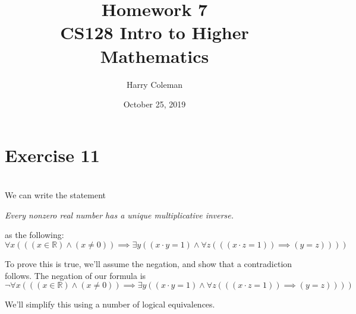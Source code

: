 \documentclass[11pt]{article}
\newcommand{\R}{\mathbb{R}}
\begin{document}
 
\title{Homework 7\\
    \large CS128 Intro to Higher Mathematics}
\author{Harry Coleman}
\date{October 25, 2019}

\maketitle

\section*{Exercise 11}
\\

We can write the statement
\begin{center}
    \emph{Every nonzero real number has a unique multiplicative inverse.}
\end{center}
as the following:
\[\forall x(((x\in\R) \land (x \ne 0)) \implies \exists y((x \cdot y = 1) \land \forall z(((x \cdot z = 1)) \implies (y = z))))\]

To prove this is true, we'll assume the negation, and show that a contradiction follows. The negation of our formula is
\[\lnot \forall x(((x\in\R) \land (x \ne 0)) \implies \exists y((x \cdot y = 1) \land \forall z(((x \cdot z = 1)) \implies (y = z))))\]

We'll simplify this using a number of logical equivalences.
\end{document}
